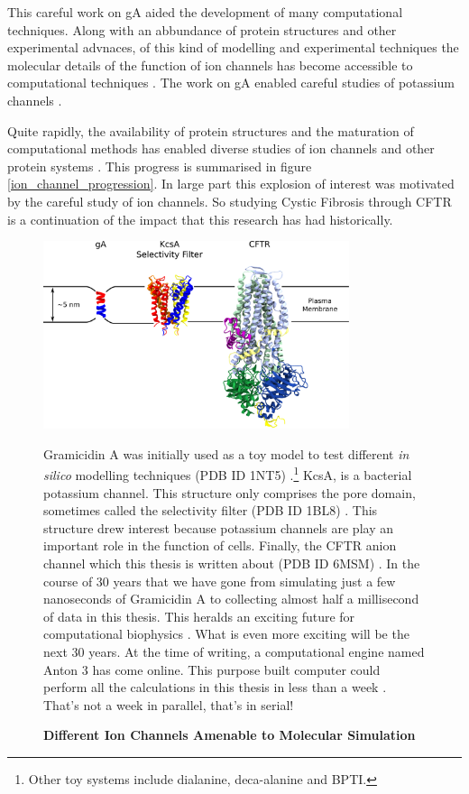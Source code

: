 This careful work on gA aided the development of many computational techniques. Along with an abbundance of protein structures and other experimental advnaces, of this kind of modelling and experimental techniques the molecular details of the function of ion channels has become accessible to computational techniques \cite{flood2019}. The work on gA enabled careful studies of potassium channels \cite{rashid2013, li2021, vandenberg2021}. 

Quite rapidly, the availability of protein structures and the maturation of computational methods has enabled diverse studies of ion channels and other protein systems \cite{lev2020, chen2021}. This progress is summarised in figure \ref{ion_channel_progression}. In large part this explosion of interest was motivated by the careful study of ion channels. So studying Cystic Fibrosis through CFTR is a continuation of the impact that this research has had historically.


\begin{figure}
	\begin{center}
		\includegraphics[width=0.8\textwidth]{figures/ion_channel_progression.pdf}
	\end{center}
	\captionsetup{singlelinecheck = false, justification=raggedright}
	\caption[Different Ion Channels Amenable to Molecular Simulation] {\textbf{Different Ion Channels Amenable to Molecular Simulation}}{Gramicidin A was initially used as a toy model to test different \textit{in silico} modelling techniques (PDB ID 1NT5) \cite{sham2003}.\footnote{Other toy systems include dialanine, deca-alanine and BPTI.} KcsA, is a bacterial potassium channel. This structure only comprises the pore domain, sometimes called the selectivity filter (PDB ID 1BL8) \cite{doyle1998}. This structure drew interest because potassium channels are play an important role in the function of cells. Finally, the CFTR anion channel which this thesis is written about (PDB ID 6MSM) \cite{zhang2018a}. In the course of 30 years that we have gone from simulating just a few nanoseconds of Gramicidin A to collecting almost half a millisecond of data in this thesis. This heralds an exciting future for computational biophysics \cite{roux1993}. What is even more exciting will be the next 30 years. At the time of writing, a computational engine named Anton 3 has come online. This purpose built computer could perform all the calculations in this thesis in less than a week \cite{russell2021}. That's not a week in parallel, that's in serial!}
	\label{action_potential_graphic}
\end{figure}

